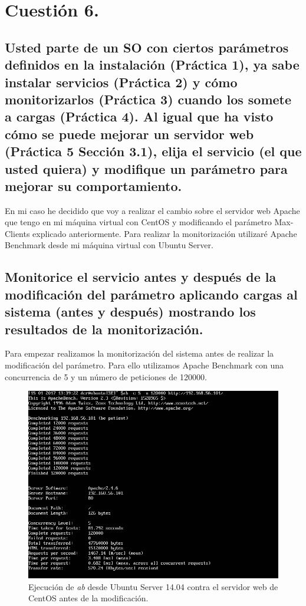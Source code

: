 \section{Cuestión 6.}
\subsection{Usted parte de un SO con ciertos parámetros definidos en la instalación (Práctica 1), ya sabe instalar servicios (Práctica 2) y cómo monitorizarlos (Práctica 3) cuando los somete a cargas (Práctica 4). Al igual que ha visto cómo se puede mejorar un servidor web (Práctica 5 Sección 3.1), elija el servicio (el que usted quiera) y modifique un parámetro para mejorar su comportamiento.}
En mi caso he decidido que voy a realizar el cambio sobre el servidor web Apache que tengo en mi máquina virtual con CentOS y modificando el parámetro Max-Clients explicado anteriormente. Para realizar la monitorización utilizaré Apache Benchmark desde mi máquina virtual con Ubuntu Server.
\subsection{Monitorice el servicio antes y después de la modificación del parámetro aplicando cargas al sistema (antes y después) mostrando los resultados de la monitorización.}
Para empezar realizamos la monitorización del sistema antes de realizar la modificación del parámetro. Para ello utilizamos Apache Benchmark con una concurrencia de 5 y un número de peticiones de 120000.

\begin{figure}[H]
	\centering
	\includegraphics[scale=0.6]{abPrevio1.png}
	\caption{Ejecución de \textit{ab} desde Ubuntu Server 14.04 contra el servidor web de CentOS antes de la modificación.}
\end{figure}

